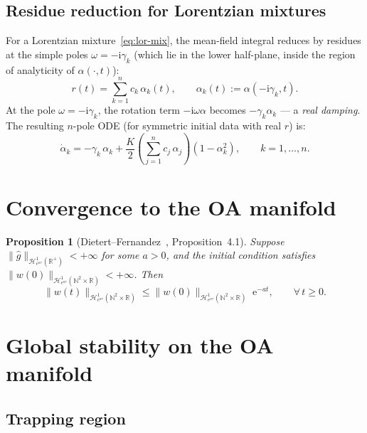 \documentclass[11pt,a4paper]{article}
\newtheorem{proposition}[theorem]{Proposition}
\theoremstyle{definition}
\newcommand{\R}{\mathbb{R}}
\newcommand{\N}{\mathbb{N}}
\begin{document}
\subsection{Residue reduction for Lorentzian mixtures}

For a Lorentzian mixture~\eqref{eq:lor-mix}, the mean-field integral reduces by residues at the simple poles $\omega = -\mathrm{i}\gamma_k$ (which lie in the lower half-plane, inside the region of analyticity of $\alpha(\cdot, t)$):
\begin{equation}\label{eq:mean-field-residue}
r(t) = \sum_{k=1}^n c_k\,\alpha_k(t), \qquad \alpha_k(t) := \alpha(-\mathrm{i}\gamma_k, t).
\end{equation}
At the pole $\omega = -\mathrm{i}\gamma_k$, the rotation term $-\mathrm{i}\omega\alpha$ becomes $-\gamma_k\alpha_k$ --- a \emph{real damping}. The resulting $n$-pole ODE (for symmetric initial data with real $r$) is:
\begin{equation}\label{eq:n-pole}
\dot{\alpha}_k = -\gamma_k\,\alpha_k + \frac{K}{2}\!\left(\sum_{j=1}^n c_j\,\alpha_j\right)\!(1 - \alpha_k^2), \qquad k = 1,\ldots,n.
\end{equation}

\section{Convergence to the OA manifold}\label{sec:oa-attract}

\begin{proposition}[Dietert--Fernandez~\cite{dietert-fernandez2018}, Proposition~4.1]\label{prop:oa-attract}
Suppose $\|\hat{g}\|_{\mathcal{H}^1_{e^{a\tau}}(\R^+)} < +\infty$ for some $a > 0$, and the initial condition satisfies $\|w(0)\|_{\mathcal{H}^1_{e^{a\tau}}(\N^2 \times \R)} < +\infty$. Then
\[
\|w(t)\|_{\mathcal{H}^1_{e^{a\tau}}(\N^2 \times \R)} \leq \|w(0)\|_{\mathcal{H}^1_{e^{a\tau}}(\N^2 \times \R)}\;\mathrm{e}^{-at}, \qquad \forall\,t \geq 0.
\]
\end{proposition}

\section{Global stability on the OA manifold}\label{sec:rational}

\subsection{Trapping region}
\end{document}
